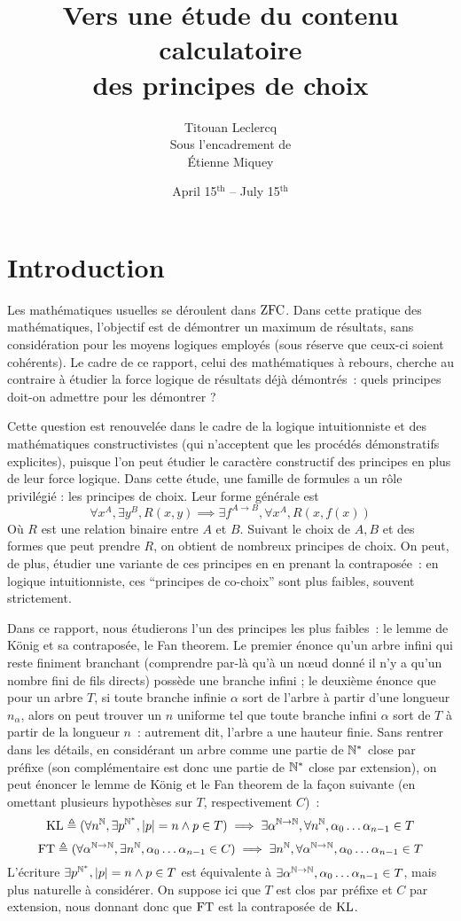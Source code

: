 \documentclass{article}
\title{Vers une étude du contenu calculatoire\\ des principes de choix}
\author{Titouan Leclercq\\ Sous l'encadrement de\\ \'Etienne Miquey}
\date{April 15$^{\mathrm{th}}$ -- July 15$^{\mathrm{th}}$}
\begin{document}
\maketitle

\tableofcontents

\section{Introduction}

Les mathématiques usuelles se déroulent dans $\mathrm{ZFC}$. Dans cette pratique des mathématiques, l'objectif est de démontrer un maximum de résultats, sans considération pour les moyens logiques employés (sous réserve que ceux-ci soient cohérents). Le cadre de ce rapport, celui des mathématiques à rebours, cherche au contraire à étudier la force logique de résultats déjà démontrés~: quels principes doit-on admettre pour les démontrer ?

Cette question est renouvelée dans le cadre de la logique intuitionniste et des mathématiques constructivistes (qui n'acceptent que les procédés démonstratifs explicites), puisque l'on peut étudier le caractère constructif des principes en plus de leur force logique. Dans cette étude, une famille de formules a un rôle privilégié : les principes de choix. Leur forme générale est
\[\forall x^A, \exists y^B, R(x,y) \implies \exists f^{A\to B}, \forall x^A, R(x,f(x))\]
Où $R$ est une relation binaire entre $A$ et $B$. Suivant le choix de $A,B$ et des formes que peut prendre $R$, on obtient de nombreux principes de choix. On peut, de plus, étudier une variante de ces principes en en prenant la contraposée~: en logique intuitionniste, ces ``principes de co-choix'' sont plus faibles, souvent strictement.

Dans ce rapport, nous étudierons l'un des principes les plus faibles~: le lemme de König et sa contraposée, le Fan theorem. Le premier énonce qu'un arbre infini qui reste finiment branchant (comprendre par-là qu'à un n\oe ud donné il n'y a qu'un nombre fini de fils directs) possède une branche infini ; le deuxième énonce que pour un arbre $T$, si toute branche infinie $\alpha$ sort de l'arbre à partir d'une longueur $n_\alpha$, alors on peut trouver un $n$ uniforme tel que toute branche infini $\alpha$ sort de $T$ à partir de la longueur $n$~: autrement dit, l'arbre a une hauteur finie. Sans rentrer dans les détails, en considérant un arbre comme une partie de $\mathbb{N}^*$ close par préfixe (son complémentaire est donc une partie de $\mathbb{N}^*$ close par extension), on peut énoncer le lemme de König et le Fan theorem de la façon suivante (en omettant plusieurs hypothèses sur $T$, respectivement $C$)~:
\[\mathrm{KL} \triangleq (\forall n^{\mathbb{N}}, \exists p^{\mathbb{N}^*}, |p| = n \land p \in T) \implies \exists \alpha^{\mathbb{N}\to\mathbb{N}}, \forall n^{\mathbb{N}}, \alpha_0\ldots\alpha_{n-1}\in T\]
\[\mathrm{FT} \triangleq (\forall \alpha^{\mathbb{N}\to\mathbb{N}}, \exists n^{\mathbb{N}}, \alpha_0\ldots \alpha_{n-1}\in C)\implies \exists n^{\mathbb{N}}, \forall \alpha^{\mathbb{N}\to\mathbb{N}}, \alpha_0\ldots\alpha_{n-1}\in T\]
L'écriture $\exists p^{\mathbb{N}^*},|p| = n \land p \in T$ est équivalente à $\exists \alpha^{\mathbb{N}\to\mathbb{N}}, \alpha_0\ldots\alpha_{n-1}\in T$, mais plus naturelle à considérer. On suppose ici que $T$ est clos par préfixe et $C$ par extension, nous donnant donc que $\mathrm{FT}$ est la contraposée de $\mathrm{KL}$.
\end{document}
